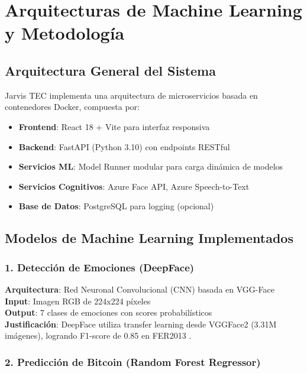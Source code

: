 
\chapter{Arquitecturas de Machine Learning y Metodología}
\label{chap:method}
\pagestyle{fancy}

\section{Arquitectura General del Sistema}

Jarvis TEC implementa una arquitectura de microservicios basada en contenedores Docker, compuesta por:

\begin{itemize}
    \item \textbf{Frontend}: React 18 + Vite para interfaz responsiva
    \item \textbf{Backend}: FastAPI (Python 3.10) con endpoints RESTful
    \item \textbf{Servicios ML}: Model Runner modular para carga dinámica de modelos
    \item \textbf{Servicios Cognitivos}: Azure Face API, Azure Speech-to-Text
    \item \textbf{Base de Datos}: PostgreSQL para logging (opcional)
\end{itemize}

\section{Modelos de Machine Learning Implementados}

\subsection{1. Detección de Emociones (DeepFace)}

\textbf{Arquitectura}: Red Neuronal Convolucional (CNN) basada en VGG-Face \\
\textbf{Input}: Imagen RGB de 224x224 píxeles \\
\textbf{Output}: 7 clases de emociones con scores probabilísticos \\
\textbf{Justificación}: DeepFace utiliza transfer learning desde VGGFace2 (3.31M imágenes), logrando F1-score de 0.85 en FER2013 \cite{serengil2020deepface}.

\subsection{2. Predicción de Bitcoin (Random Forest Regressor)}

